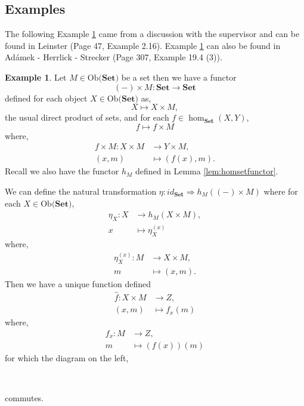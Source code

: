 \documentclass[11pt,a4paper]{article}
\theoremstyle{definition}
\newtheorem{example}[thm]{Example}
\newcommand\ho[3][]{\hom_{#1}(#2,#3)}
\newcommand\ob[1]{\mathrm{Ob(}#1\mathrm{)}}
\newcommand\nattran[3]{#1\colon#2\Rightarrow#3}
\numberwithin{equation}{section}
\begin{document}
\subsection{Examples}
\label{ss:adjexe}


The following Example \ref{exe:yonedaadj} came from a discussion with the supervisor and can be found in Leinster \cite{Leinster} (Page 47, Example 2.16). Example \ref{exe:yonedaadj} can also be found in Adámek - Herrlick - Strecker \cite{ACC} (Page 307, Example 19.4 (3)).
\begin{example}
    \label{exe:yonedaadj}
    Let $M\in\ob{\mathbf{Set}}$ be a set then we have a functor
    \[(-)\times M \colon \mathbf{Set} \to\mathbf{Set} \]
    defined for each object $X\in\ob{\mathbf{Set}}$ as,
    \[X\mapsto X\times M,\]
    the usual direct product of sets,
    and for each $f\in\ho[\mathbf{Set}]{X}{Y}$,
    \[f\mapsto f\times M\]
    where,
    \begin{align*}
        f\times M \colon X\times M &\to Y\times M,\\
        (x,m)&\mapsto (f(x),m).
    \end{align*}
    Recall we also have the functor $h_{M}$ defined in Lemma \ref{lem:homsetfunctor}.
    
    We can define the natural transformation $\nattran{\eta}{id_{\mathbf{Set}}}{{h_{M}((-)\times M)}}$ where for each $X\in\ob{\mathbf{Set}}$,
    \begin{align*}
        \eta_{X}\colon X &\to h_{M}(X\times M),\\
        x&\mapsto \eta_{X}^{(x)}
    \end{align*}
where,
\begin{align*}
    \eta_{X}^{(x)}\colon M&\to X\times M,\\
    m&\mapsto (x,m).
\end{align*}
Then we have a unique function defined
\begin{align*}
    \hat{f}\colon X\times M&\to Z,\\
    (x,m)&\mapsto f_{x}(m)
\end{align*}
where,
\begin{align*}
    f_{x}\colon M&\to Z,\\
    m &\mapsto (f(x))(m)
\end{align*}
for which the diagram on the left,
\begin{center}
\\
\end{center}
commutes.


\end{example}
\end{document}
